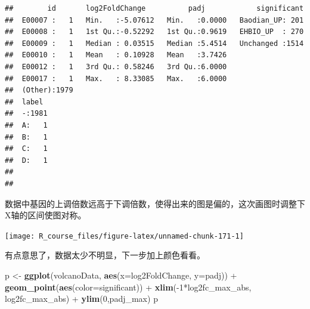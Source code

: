 \documentclass[]{article}
\newenvironment{Shaded}{\begin{snugshade}}{\end{snugshade}}
\newcommand{\KeywordTok}[1]{\textcolor[rgb]{0.13,0.29,0.53}{\textbf{{#1}}}}
\newcommand{\DataTypeTok}[1]{\textcolor[rgb]{0.13,0.29,0.53}{{#1}}}
\newcommand{\DecValTok}[1]{\textcolor[rgb]{0.00,0.00,0.81}{{#1}}}
\newcommand{\FloatTok}[1]{\textcolor[rgb]{0.00,0.00,0.81}{{#1}}}
\newcommand{\StringTok}[1]{\textcolor[rgb]{0.31,0.60,0.02}{{#1}}}
\newcommand{\NormalTok}[1]{{#1}}
\numberwithin{figure}{section}
\numberwithin{table}{section}
\theoremstyle{definition}
\theoremstyle{definition}
\theoremstyle{definition}
\theoremstyle{remark}
\begin{document}
\begin{verbatim}
##        id       log2FoldChange          padj            significant  
##  E00007 :   1   Min.   :-5.07612   Min.   :0.0000   Baodian_UP: 201  
##  E00008 :   1   1st Qu.:-0.52292   1st Qu.:0.9619   EHBIO_UP  : 270  
##  E00009 :   1   Median : 0.03515   Median :5.4514   Unchanged :1514  
##  E00010 :   1   Mean   : 0.10928   Mean   :3.7426                    
##  E00012 :   1   3rd Qu.: 0.58246   3rd Qu.:6.0000                    
##  E00017 :   1   Max.   : 8.33085   Max.   :6.0000                    
##  (Other):1979                                                        
##  label   
##  -:1981  
##  A:   1  
##  B:   1  
##  C:   1  
##  D:   1  
##          
## 
\end{verbatim}

数据中基因的上调倍数远高于下调倍数，使得出来的图是偏的，这次画图时调整下X轴的区间使图对称。

\begin{Shaded}
\end{Shaded}

\begin{center}\texttt{[image: R\_course\_files/figure-latex/unnamed-chunk-171-1]} \end{center}

有点意思了，数据太少不明显，下一步加上颜色看看。

\begin{Shaded}
\begin{Highlighting}[]
\NormalTok{p <-}\StringTok{ }\KeywordTok{ggplot}\NormalTok{(volcanoData,  }\KeywordTok{aes}\NormalTok{(}\DataTypeTok{x=}\NormalTok{log2FoldChange,  }\DataTypeTok{y=}\NormalTok{padj)) +}
\StringTok{     }\KeywordTok{geom_point}\NormalTok{(}\KeywordTok{aes}\NormalTok{(}\DataTypeTok{color=}\NormalTok{significant)) +}\StringTok{  }
\StringTok{    }\KeywordTok{xlim}\NormalTok{(-}\DecValTok{1}\NormalTok{*log2fc_max_abs, log2fc_max_abs) +}\StringTok{ }\KeywordTok{ylim}\NormalTok{(}\DecValTok{0}\NormalTok{,padj_max)}
\NormalTok{p}
\end{Highlighting}
\end{Shaded}
\end{document}
